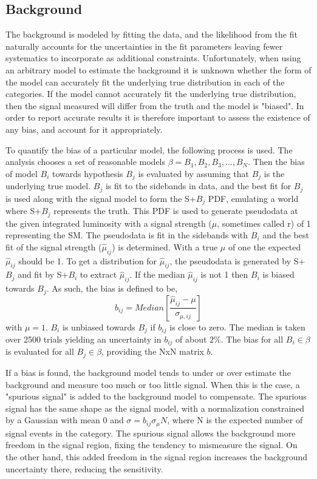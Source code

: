 \FloatBarrier
\subsection{Background}
The background is modeled by fitting the data, and the likelihood from the fit naturally accounts for the uncertainties in the fit parameters leaving fewer systematics to incorporate as additional constraints. Unfortunately, when using an arbitrary model to estimate the background it is unknown whether the form of the model can accurately fit the underlying true distribution in each of the categories. If the model cannot accurately fit the underlying true distribution, then the signal measured will differ from the truth and the model is "biased". In order to report accurate results it is therefore important to assess the existence of any bias, and account for it appropriately. 

To quantify the bias of a particular model, the following process is used. The analysis chooses a set of reasonable models $\beta = {B_1, B_2, B_3, ..., B_N}$. Then the bias of model $B_i$ towards hypothesis $B_j$ is evaluated by assuming that $B_j$ is the underlying true model. $B_j$ is fit to the sidebands in data, and the best fit for $B_j$ is used along with the signal model to form the S+$B_j$ PDF, emulating a world where S+$B_j$ represents the truth. This PDF is used to generate pseudodata at the given integrated luminosity with a signal strength ($\mu$, sometimes called r) of 1 representing the SM. The pseudodata is fit in the sidebands with $B_i$ and the best fit of the signal strength ($\hat{\mu}_{ij}$) is determined. With a true $\mu$ of one the expected $\hat{\mu}_{ij}$ should be 1. To get a distribution for $\hat{\mu}_{ij}$, the pseudodata is generated by S+$B_j$ and fit by S+$B_i$ to extract $\hat{\mu}_{ij}$. If the median $\hat{\mu}_{ij}$ is not 1 then $B_{i}$ is biased towards $B_{j}$. As such, the bias is defined to be,
\begin{equation}
b_{ij} = Median\left[\frac{\hat{\mu}_{ij} - \mu}{\sigma_{\mu,ij}}\right]
\end{equation}
with $\mu=1$. $B_i$ is unbiased towards $B_j$ if $b_{ij}$ is close to zero. The median is taken over 2500 trials yielding an uncertainty in $b_{ij}$ of about $2\%$. The bias for all $B_i \in \beta$ is evaluated for all $B_j \in \beta$, providing the NxN matrix $b$. 

If a bias is found, the background model tends to under or over estimate the background and measure too much or too little signal. When this is the case, a "spurious signal" is added to the background model to compensate. The spurious signal has the same shape as the signal model, with a normalization constrained by a Gaussian with mean 0 and $\sigma = b_{ij}\sigma_{\mu}N$, where N is the expected number of signal events in the category. The spurious signal allows the background more freedom in the signal region, fixing the tendency to mismeasure the signal. On the other hand, this added freedom in the signal region increases the background uncertainty there, reducing the sensitivity. 

